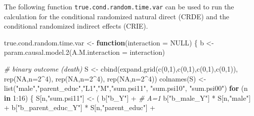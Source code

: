 \documentclass[
]{book}
\newenvironment{Shaded}{\begin{snugshade}}{\end{snugshade}}
\newcommand{\AttributeTok}[1]{\textcolor[rgb]{0.77,0.63,0.00}{#1}}
\newcommand{\CommentTok}[1]{\textcolor[rgb]{0.56,0.35,0.01}{\textit{#1}}}
\newcommand{\ConstantTok}[1]{\textcolor[rgb]{0.00,0.00,0.00}{#1}}
\newcommand{\ControlFlowTok}[1]{\textcolor[rgb]{0.13,0.29,0.53}{\textbf{#1}}}
\newcommand{\DecValTok}[1]{\textcolor[rgb]{0.00,0.00,0.81}{#1}}
\newcommand{\FunctionTok}[1]{\textcolor[rgb]{0.00,0.00,0.00}{#1}}
\newcommand{\NormalTok}[1]{#1}
\newcommand{\OtherTok}[1]{\textcolor[rgb]{0.56,0.35,0.01}{#1}}
\newcommand{\SpecialCharTok}[1]{\textcolor[rgb]{0.00,0.00,0.00}{#1}}
\newcommand{\StringTok}[1]{\textcolor[rgb]{0.31,0.60,0.02}{#1}}
\begin{document}
The following function \texttt{true.cond.random.time.var} can be used to run the calculation for the conditional randomized natural direct (CRDE) and the conditional randomized indirect effects (CRIE).

\begin{Shaded}
\begin{Highlighting}[]
\NormalTok{true.cond.random.time.var }\OtherTok{\textless{}{-}} \ControlFlowTok{function}\NormalTok{(}\AttributeTok{interaction =} \ConstantTok{NULL}\NormalTok{) \{}
\NormalTok{  b }\OtherTok{\textless{}{-}} \FunctionTok{param.causal.model.2}\NormalTok{(}\AttributeTok{A.M.interaction =}\NormalTok{ interaction)}
  
  \CommentTok{\# binary outcome (death)}
\NormalTok{  S }\OtherTok{\textless{}{-}} \FunctionTok{cbind}\NormalTok{(}\FunctionTok{expand.grid}\NormalTok{(}\FunctionTok{c}\NormalTok{(}\DecValTok{0}\NormalTok{,}\DecValTok{1}\NormalTok{),}\FunctionTok{c}\NormalTok{(}\DecValTok{0}\NormalTok{,}\DecValTok{1}\NormalTok{),}\FunctionTok{c}\NormalTok{(}\DecValTok{0}\NormalTok{,}\DecValTok{1}\NormalTok{),}\FunctionTok{c}\NormalTok{(}\DecValTok{0}\NormalTok{,}\DecValTok{1}\NormalTok{)), }\FunctionTok{rep}\NormalTok{(}\ConstantTok{NA}\NormalTok{,}\AttributeTok{n=}\DecValTok{2}\SpecialCharTok{\^{}}\DecValTok{4}\NormalTok{), }
             \FunctionTok{rep}\NormalTok{(}\ConstantTok{NA}\NormalTok{,}\AttributeTok{n=}\DecValTok{2}\SpecialCharTok{\^{}}\DecValTok{4}\NormalTok{), }\FunctionTok{rep}\NormalTok{(}\ConstantTok{NA}\NormalTok{,}\AttributeTok{n=}\DecValTok{2}\SpecialCharTok{\^{}}\DecValTok{4}\NormalTok{))}
  \FunctionTok{colnames}\NormalTok{(S) }\OtherTok{\textless{}{-}} \FunctionTok{list}\NormalTok{(}\StringTok{"male"}\NormalTok{,}\StringTok{"parent\_educ"}\NormalTok{,}\StringTok{"L1"}\NormalTok{,}\StringTok{"M"}\NormalTok{,}\StringTok{"sum.psi11"}\NormalTok{, }\StringTok{"sum.psi10"}\NormalTok{, }
                      \StringTok{"sum.psi00"}\NormalTok{)}
  \ControlFlowTok{for}\NormalTok{ (n }\ControlFlowTok{in} \DecValTok{1}\SpecialCharTok{:}\DecValTok{16}\NormalTok{) \{}
\NormalTok{    S[n,}\StringTok{"sum.psi11"}\NormalTok{] }\OtherTok{\textless{}{-}}\NormalTok{  ( b[}\StringTok{"b\_Y"}\NormalTok{] }\SpecialCharTok{+}                                           \CommentTok{\# A=1}
\NormalTok{                             b[}\StringTok{"b\_male\_Y"}\NormalTok{] }\SpecialCharTok{*}\NormalTok{ S[n,}\StringTok{"male"}\NormalTok{] }\SpecialCharTok{+} 
\NormalTok{                             b[}\StringTok{"b\_parent\_educ\_Y"}\NormalTok{] }\SpecialCharTok{*}\NormalTok{ S[n,}\StringTok{"parent\_educ"}\NormalTok{] }\SpecialCharTok{+} 

\end{Highlighting}
\end{Shaded}
\end{document}
